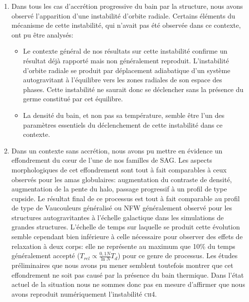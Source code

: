 \begin{enumerate}

	\item Dans tous les cas d'accrétion progressive du bain par la structure,
	nous avons observé l'apparition d'une instabilité d'orbite radiale.
	Certains éléments du mécanisme de cette instabilité,
	qui n'avait pas été observée dans ce contexte, ont pu être
	analysés:

	\begin{itemize}
		\item Le contexte général de nos résultats sur cette
		instabilité confirme un résultat déjà rapporté mais non
		généralement reproduit. L'instabilité d'orbite radiale se produit
		par déplacement adiabatique d'un système autogravitant à
		l'équilibre vers les zones radiales de son espace des phases. Cette
		instabilité ne saurait donc se déclencher sans la présence du
		germe constitué par cet équilibre.

		\item La densité du bain, et non pas sa température, semble être
		l'un des paramètres essentiels du déclenchement de cette
		instabilité dans ce contexte. 
	\end{itemize}

	\item Dans un contexte sans accrétion, nous avons pu mettre en
	évidence un effondrement du cœur de l'une de nos familles de SAG. Les
	aspects morphologiques de cet effondrement sont tout à fait comparables
	à ceux observés pour les amas globulaires: augmentation du contraste
	de densité, augmentation de la pente du halo, passage progressif à un
	profil de type cupside. Le résultat final de ce processus est tout à
	fait comparable au profil de type de Vaucouleurs généralisé ou NFW
	généralement observé pour les structures autogravitantes à
	l'échelle galactique dans les simulations de grandes structures.
	L'échelle de temps sur laquelle se produit cette évolution semble
	cependant bien inférieure à celle nécessaire pour observer des
	effets de relaxation à deux corps: elle ne représente au maximum que
	10\% du temps généralement accepté ($T_{rel}\propto\frac{0,1N}{\ln
	N}T_{d}$) pour ce genre de processus. Les études préliminaires que
	nous avons pu mener semblent toutefois montrer que cet effondrement ne soit
	pas causé par la présence du bain thermique. Dans l'état actuel de
	la situation nous ne sommes donc pas en mesure d'affirmer que nous avons
	reproduit numériquement l'instabilité \textsc{ch4}.
\end{enumerate}



